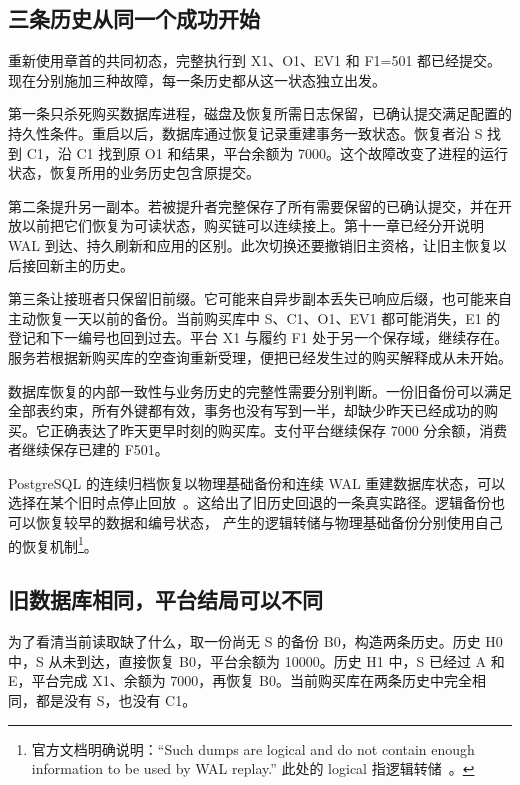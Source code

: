 \subsection*{三条历史从同一个成功开始}

重新使用章首的共同初态，完整执行到 X1、O1、EV1 和 F1=501 都已经提交。现在分别施加三种故障，每一条历史都从这一状态独立出发。

第一条只杀死购买数据库进程，磁盘及恢复所需日志保留，已确认提交满足配置的持久性条件。重启以后，数据库通过恢复记录重建事务一致状态。恢复者沿 S 找到 C1，沿 C1 找到原 O1 和结果，平台余额为 7000。这个故障改变了进程的运行状态，恢复所用的业务历史包含原提交。

第二条提升另一副本。若被提升者完整保存了所有需要保留的已确认提交，并在开放以前把它们恢复为可读状态，购买链可以连续接上。第十一章已经分开说明 WAL 到达、持久刷新和应用的区别。此次切换还要撤销旧主资格，让旧主恢复以后接回新主的历史。

第三条让接班者只保留旧前缀。它可能来自异步副本丢失已响应后缀，也可能来自主动恢复一天以前的备份。当前购买库中 S、C1、O1、EV1 都可能消失，E1 的登记和下一编号也回到过去。平台 X1 与履约 F1 处于另一个保存域，继续存在。服务若根据新购买库的空查询重新受理，便把已经发生过的购买解释成从未开始。


数据库恢复的内部一致性与业务历史的完整性需要分别判断。一份旧备份可以满足全部表约束，所有外键都有效，事务也没有写到一半，却缺少昨天已经成功的购买。它正确表达了昨天更早时刻的购买库。支付平台继续保存 7000 分余额，消费者继续保存已建的 F501。

PostgreSQL 的连续归档恢复以物理基础备份和连续 WAL 重建数据库状态，可以选择在某个旧时点停止回放~\cite{pg18-recovery}。这给出了旧历史回退的一条真实路径。逻辑备份也可以恢复较早的数据和编号状态， 产生的逻辑转储与物理基础备份分别使用自己的恢复机制\footnote{官方文档明确说明：“Such dumps are logical and do not contain enough information to be used by WAL replay.” 此处的 logical 指逻辑转储~\cite{pg18-recovery}。}。

\subsection*{旧数据库相同，平台结局可以不同}

为了看清当前读取缺了什么，取一份尚无 S 的备份 B0，构造两条历史。历史 H0 中，S 从未到达，直接恢复 B0，平台余额为 10000。历史 H1 中，S 已经过 A 和 E，平台完成 X1、余额为 7000，再恢复 B0。当前购买库在两条历史中完全相同，都是没有 S，也没有 C1。

